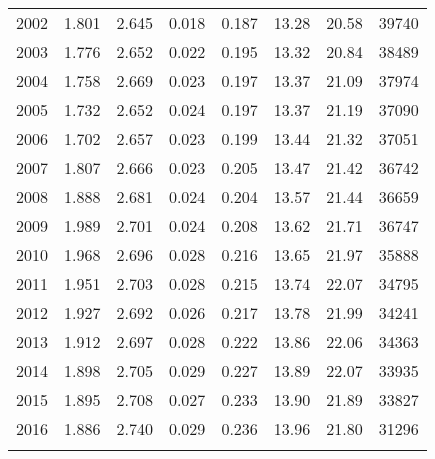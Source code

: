 \begin{table}[!htbp]
\begin{tabular}{@{\extracolsep{5pt}} cccccccc}
2002 & 1.801 & 2.645 & 0.018 & 0.187 & 13.28 & 20.58 & 39740 \\ 
2003 & 1.776 & 2.652 & 0.022 & 0.195 & 13.32 & 20.84 & 38489 \\ 
2004 & 1.758 & 2.669 & 0.023 & 0.197 & 13.37 & 21.09 & 37974 \\ 
2005 & 1.732 & 2.652 & 0.024 & 0.197 & 13.37 & 21.19 & 37090 \\ 
2006 & 1.702 & 2.657 & 0.023 & 0.199 & 13.44 & 21.32 & 37051 \\ 
2007 & 1.807 & 2.666 & 0.023 & 0.205 & 13.47 & 21.42 & 36742 \\ 
2008 & 1.888 & 2.681 & 0.024 & 0.204 & 13.57 & 21.44 & 36659 \\ 
2009 & 1.989 & 2.701 & 0.024 & 0.208 & 13.62 & 21.71 & 36747 \\ 
2010 & 1.968 & 2.696 & 0.028 & 0.216 & 13.65 & 21.97 & 35888 \\ 
2011 & 1.951 & 2.703 & 0.028 & 0.215 & 13.74 & 22.07 & 34795 \\ 
2012 & 1.927 & 2.692 & 0.026 & 0.217 & 13.78 & 21.99 & 34241 \\ 
2013 & 1.912 & 2.697 & 0.028 & 0.222 & 13.86 & 22.06 & 34363 \\ 
2014 & 1.898 & 2.705 & 0.029 & 0.227 & 13.89 & 22.07 & 33935 \\ 
2015 & 1.895 & 2.708 & 0.027 & 0.233 & 13.90 & 21.89 & 33827 \\ 
2016 & 1.886 & 2.740 & 0.029 & 0.236 & 13.96 & 21.80 & 31296 \\ 
\hline \\[-1.8ex] 
\end{tabular} 
\end{table} 
